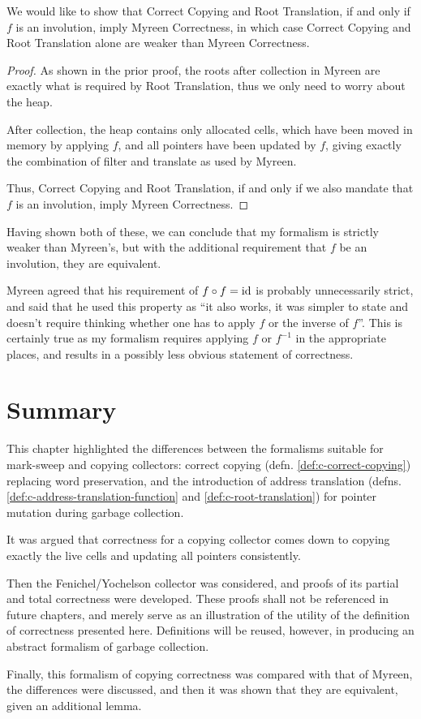 \begin{theorem}
  We would like to show that Correct Copying and Root Translation, if
  and only if $f$ is an involution, imply Myreen Correctness, in which
  case Correct Copying and Root Translation alone are weaker than
  Myreen Correctness.

  \begin{proof}
    As shown in the prior proof, the roots after collection in Myreen
    are exactly what is required by Root Translation, thus we only
    need to worry about the heap.

    After collection, the heap contains only allocated cells, which
    have been moved in memory by applying $f$, and all pointers have
    been updated by $f$, giving exactly the combination of filter and
    translate as used by Myreen.

    Thus, Correct Copying and Root Translation, if and only if we also
    mandate that $f$ is an involution, imply Myreen Correctness.
  \end{proof}
\end{theorem}

Having shown both of these, we can conclude that my formalism is
strictly weaker than Myreen's, but with the additional requirement
that $f$ be an involution, they are equivalent.

Myreen\cite{MyreenEmail} agreed that his requirement of $f \circ f =
\mathrm{id}$ is probably unnecessarily strict, and said that he used this
property as ``it also works, it was simpler to state and doesn't
require thinking whether one has to apply $f$ or the inverse of
$f$''. This is certainly true as my formalism requires applying $f$ or
$f^{-1}$ in the appropriate places, and results in a possibly less
obvious statement of correctness.

\section{Summary}
\label{sec:copying-summary}

This chapter highlighted the differences between the formalisms
suitable for mark-sweep and copying collectors: correct copying
(defn. \ref{def:c-correct-copying}) replacing word preservation, and
the introduction of address translation
(defns. \ref{def:c-address-translation-function} and
\ref{def:c-root-translation}) for pointer mutation during garbage
collection.

It was argued that correctness for a copying collector comes down to
copying exactly the live cells and updating all pointers consistently.

Then the Fenichel/Yochelson\cite{Fenichel69} collector was considered,
and proofs of its partial and total correctness were developed. These
proofs shall not be referenced in future chapters, and merely serve as
an illustration of the utility of the definition of correctness
presented here. Definitions will be reused, however, in producing an
abstract formalism of garbage collection.

Finally, this formalism of copying correctness was compared with that
of Myreen\cite{Myreen10}, the differences were discussed, and then it
was shown that they are equivalent, given an additional lemma.
